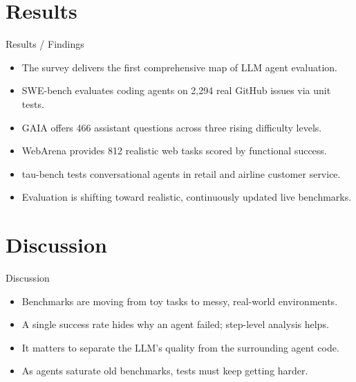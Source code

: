 \documentclass[10pt]{beamer}
\begin{document}
\section{Results}
\begin{frame}[allowframebreaks]{Results / Findings}
\begin{itemize}
  \item The survey delivers the first comprehensive map of LLM agent evaluation.
  \item SWE-bench evaluates coding agents on 2,294 real GitHub issues via unit tests.
  \item GAIA offers 466 assistant questions across three rising difficulty levels.
  \item WebArena provides 812 realistic web tasks scored by functional success.
  \item tau-bench tests conversational agents in retail and airline customer service.
  \item Evaluation is shifting toward realistic, continuously updated live benchmarks.
\end{itemize}
\end{frame}
\section{Discussion}
\begin{frame}{Discussion}
\begin{itemize}
  \item Benchmarks are moving from toy tasks to messy, real-world environments.
  \item A single success rate hides why an agent failed; step-level analysis helps.
  \item It matters to separate the LLM's quality from the surrounding agent code.
  \item As agents saturate old benchmarks, tests must keep getting harder.
\end{itemize}
\end{frame}
\end{document}
